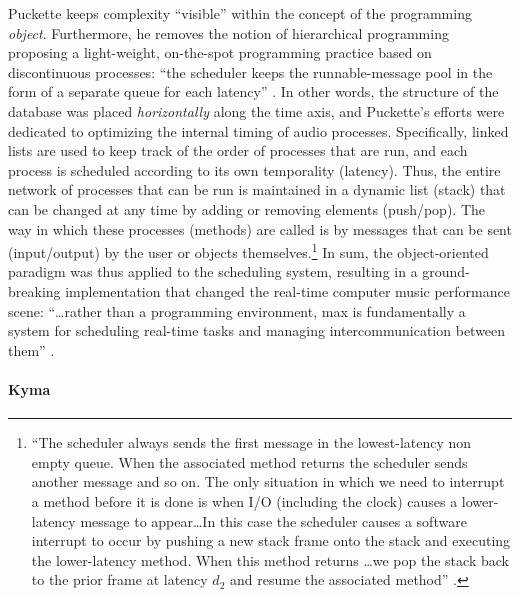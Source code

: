 \documentclass[
]{book}
\begin{document}
Puckette keeps complexity ``visible'' within the concept of the programming \textit{object}. Furthermore, he removes the notion of hierarchical programming proposing a light-weight, on-the-spot programming practice based on discontinuous processes: ``the scheduler keeps the runnable-message pool in the form of a separate queue for each latency'' \parencite[46]{DBLP:conf/icmc/Puckette86}. In other words, the structure of the database was placed \textit{horizontally} along the time axis, and Puckette's efforts were dedicated to optimizing the internal timing of audio processes. Specifically, linked lists are used to keep track of the order of processes that are run, and each process is scheduled according to its own temporality (latency). Thus, the entire network of processes that can be run is maintained in a dynamic list (stack) that can be changed at any time by adding or removing elements (push/pop). The way in which these processes (methods) are called is by messages that can be sent (input/output) by the user or objects themselves.\footnote{``The scheduler always sends the first message in the lowest-latency non empty queue. When the associated method returns the scheduler sends another message and so on. The only situation in which we need to interrupt a method before it is done is when I/O (including the clock) causes a lower-latency message to appear\dots In this case the scheduler causes a software interrupt to occur by pushing a new stack frame onto the stack and executing the lower-latency method. When this method returns \dots we pop the stack back to the prior frame at latency \(d_2\) and resume the associated method'' \parencite[46]{DBLP:conf/icmc/Puckette86}.} In sum, the object-oriented paradigm was thus applied to the scheduling system, resulting in a ground-breaking implementation that changed the real-time computer music performance scene: ``\dots rather than a programming environment, \gls{max} is fundamentally a system for scheduling real-time tasks and managing intercommunication between them'' \parencite{DBLP:journals/comj/Puckette02}.

\paragraph{Kyma}
\label{computer:kyma}
\end{document}
